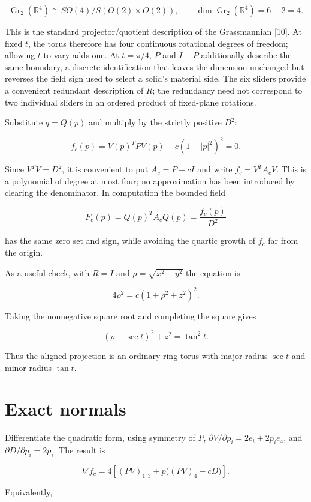 \documentclass[11pt,a4paper]{article}
\begin{document}
\[
\operatorname{Gr}_2(\mathbb R^4)\cong SO(4)/S(O(2)\times O(2)),\qquad
\dim\operatorname{Gr}_2(\mathbb R^4)=6-2=4.
\]

This is the standard projector/quotient description of the Grassmannian
{[}10{]}. At fixed \(t\), the torus therefore has four continuous
rotational degrees of freedom; allowing \(t\) to vary adds one. At
\(t=\pi/4\), \(P\) and \(I-P\) additionally describe the same boundary,
a discrete identification that leaves the dimension unchanged but
reverses the field sign used to select a solid's material side. The six
sliders provide a convenient redundant description of \(R\); the
redundancy need not correspond to two individual sliders in an ordered
product of fixed-plane rotations.

Substitute \(q=Q(p)\) and multiply by the strictly positive \(D^2\):

\[
\boxed{f_c(p)=V(p)^TPV(p)-c(1+|p|^2)^2=0.}
\]

Since \(V^TV=D^2\), it is convenient to put \(A_c=P-cI\) and write
\(f_c=V^TA_cV\). This is a polynomial of degree at most four; no
approximation has been introduced by clearing the denominator. In
computation the bounded field

\[
F_c(p)=Q(p)^TA_cQ(p)=\frac{f_c(p)}{D^2}
\]

has the same zero set and sign, while avoiding the quartic growth of
\(f_c\) far from the origin.

As a useful check, with \(R=I\) and \(\rho=\sqrt{x^2+y^2}\) the equation
is

\[
4\rho^2=c(1+\rho^2+z^2)^2.
\]

Taking the nonnegative square root and completing the square gives

\[
(\rho-\sec t)^2+z^2=\tan^2t.
\]

Thus the aligned projection is an ordinary ring torus with major radius
\(\sec t\) and minor radius \(\tan t\).

\section{Exact normals}\label{exact-normals}

Differentiate the quadratic form, using symmetry of \(P\),
\(\partial V/\partial p_i=2e_i+2p_i e_4\), and
\(\partial D/\partial p_i=2p_i\). The result is

\[
\boxed{\nabla f_c=4\left[(PV)_{1:3}+p\bigl((PV)_4-cD\bigr)\right].}
\]

Equivalently,
\end{document}
